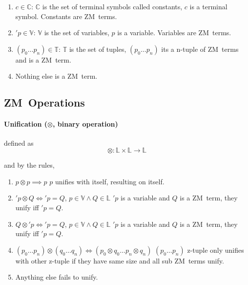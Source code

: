 \documentclass[11pt,a4paper]{report}
\newcommand{\zm}{ZM}
\newcommand{\var}[1]{'#1}
\newcommand{\unify}{\otimes}
\begin{document}
\begin{enumerate}
\item $c \in \mathbb{C}$: $\mathbb{C}$ is the set of terminal symbols called constants, $c$ is a terminal symbol. Constants are \zm\ terms.
\item $'p \in \mathbb{V}$: $\mathbb{V}$ is the set of variables, $p$ is a variable. Variables are \zm\ terms.
\item $(p_{0} \ldots p_{n}) \in \mathbb{T}$: $\mathbb{T}$ is the set of tuples, $(p_{0} \ldots p_{n})$ its a n-tuple of \zm\ terms and is a \zm\ term.
\item Nothing else is a \zm\ term.
\end{enumerate}


\subsection{\zm\ Operations}

\paragraph{Unification ($\unify$, binary operation)} defined as 
\[
    \unify: \mathbb{L} \times \mathbb{L} \rightarrow \mathbb{L}
\] 

and by the rules,

\begin{enumerate}
\item $p \unify p \implies p$
    \subitem $p$ unifies with itself, resulting on itself.

\item $\var{p} \unify Q \iff \var{p} = Q$, $p \in \mathbb{V} \wedge Q \in \mathbb{L}$
    \subitem $\var{p}$ is a variable and $Q$ is a \zm\ term, they unify iff $\var{p} = Q$.

\item $Q \unify \var{p} \iff \var{p} = Q$, $p \in \mathbb{V} \wedge Q \in \mathbb{L}$
    \subitem $\var{p}$ is a variable and $Q$ is a \zm\ term, they unify iff $\var{p} = Q$.

\item $(p_{0} \ldots p_{n}) \unify (q_{0} \ldots q_{n}) \iff (p_{0} \unify q_{0} \ldots p_{n} \unify q_{n})$
    \subitem $(p_{0} \ldots p_{n})$ z-tuple only unifies with other z-tuple if they have same size and all sub \zm\ terms unify.
    
\item Anything else fails to unify.
\end{enumerate}
\end{document}
